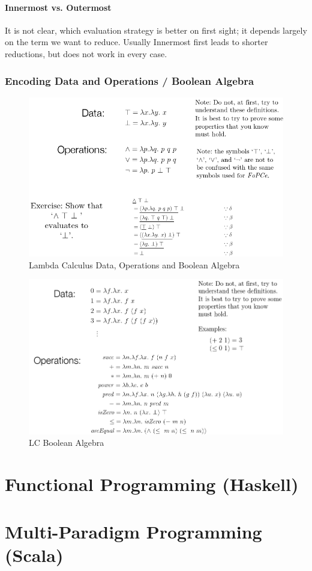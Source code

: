 \paragraph{Innermost vs. Outermost}

It is not clear, which evaluation strategy is better on first sight; it depends largely on the term we want to reduce. Usually Innermost first leads to shorter reductions, but does not work in every case.

\subsubsection{Encoding Data and Operations / Boolean Algebra}
\begin{figure}[H]
\centering
\includegraphics[width=0.7\linewidth]{images/lc_data_operations_algebra}
\caption{Lambda Calculus Data, Operations and Boolean Algebra}
\label{fig:lcdataoperationsalgebra}
\end{figure}

\begin{figure}[H]
\centering
\includegraphics[width=0.7\linewidth]{images/lc_algebra}
\caption{LC Boolean Algebra}
\label{fig:lcalgebra}
\end{figure}


\section{Functional Programming (Haskell)}

\section{Multi-Paradigm Programming (Scala)}



